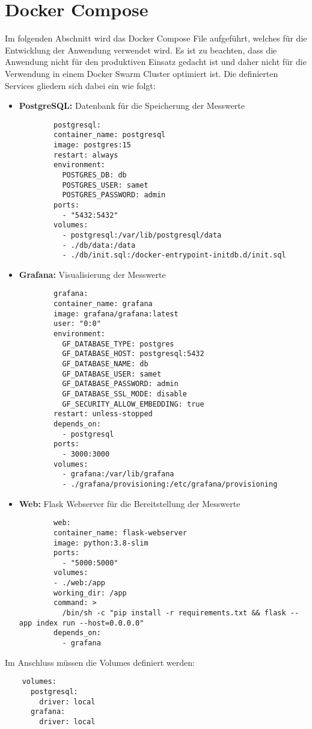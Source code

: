 \chapter{Docker Compose}

Im folgenden Abschnitt wird das Docker Compose File aufgeführt, welches für die Entwicklung der Anwendung verwendet wird. Es ist zu beachten, dass die Anwendung nicht für den produktiven Einsatz gedacht ist und daher nicht für die Verwendung in einem Docker Swarm Cluster optimiert ist. Die definierten Services gliedern sich dabei ein wie folgt:

\begin{itemize}
    \item \textbf{PostgreSQL:} Datenbank für die Speicherung der Messwerte
    \begin{verbatim}
        postgresql:
        container_name: postgresql
        image: postgres:15
        restart: always
        environment:
          POSTGRES_DB: db
          POSTGRES_USER: samet
          POSTGRES_PASSWORD: admin
        ports:
          - "5432:5432"
        volumes:
          - postgresql:/var/lib/postgresql/data
          - ./db/data:/data
          - ./db/init.sql:/docker-entrypoint-initdb.d/init.sql
    \end{verbatim}
    \item \textbf{Grafana:} Visualisierung der Messwerte
    \begin{verbatim}
        grafana:
        container_name: grafana
        image: grafana/grafana:latest
        user: "0:0"
        environment:
          GF_DATABASE_TYPE: postgres
          GF_DATABASE_HOST: postgresql:5432
          GF_DATABASE_NAME: db
          GF_DATABASE_USER: samet
          GF_DATABASE_PASSWORD: admin
          GF_DATABASE_SSL_MODE: disable
          GF_SECURITY_ALLOW_EMBEDDING: true
        restart: unless-stopped
        depends_on:
          - postgresql
        ports:
          - 3000:3000
        volumes:
          - grafana:/var/lib/grafana
          - ./grafana/provisioning:/etc/grafana/provisioning
    \end{verbatim}
    \item \textbf{Web:} Flask Webserver für die Bereitstellung der Messwerte
    \begin{verbatim}
        web:
        container_name: flask-webserver
        image: python:3.8-slim
        ports:
          - "5000:5000"
        volumes:
        - ./web:/app
        working_dir: /app
        command: > 
          /bin/sh -c "pip install -r requirements.txt && flask --app index run --host=0.0.0.0"
        depends_on:
          - grafana
    \end{verbatim}
\end{itemize}

Im Anschluss müssen die Volumes definiert werden:
\begin{verbatim}
    volumes:
      postgresql:
        driver: local
      grafana:
        driver: local
\end{verbatim}